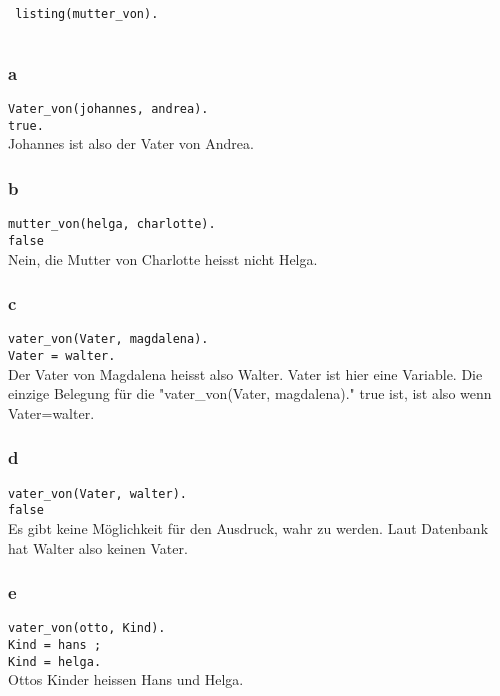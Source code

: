 \documentclass[11pt]{article}
\begin{document}
\verb| listing(mutter_von).| \\

\section{}
\subsection{}
\subsubsection*{a}
\verb|Vater_von(johannes, andrea).| \\
\verb|true.| \\
Johannes ist also der Vater von Andrea.
\\

\subsubsection*{b}
\verb|mutter_von(helga, charlotte).| \\
\verb|false| \\
Nein, die Mutter von Charlotte heisst nicht Helga.
\\

\subsubsection*{c}
\verb|vater_von(Vater, magdalena).| \\
\verb|Vater = walter.| \\
Der Vater von Magdalena heisst also Walter. Vater ist hier eine Variable.
Die einzige Belegung für die "vater\_von(Vater, magdalena)." true ist,
ist also wenn Vater=walter.

\subsubsection*{d}
\verb|vater_von(Vater, walter).| \\
\verb|false| \\
Es gibt keine Möglichkeit für den Ausdruck, wahr zu werden.
Laut Datenbank hat Walter also keinen Vater.
\\

\subsubsection*{e}
\verb|vater_von(otto, Kind).| \\
\verb|Kind = hans ;| \\
\verb|Kind = helga.| \\
Ottos Kinder heissen Hans und Helga.
\\
\end{document}
